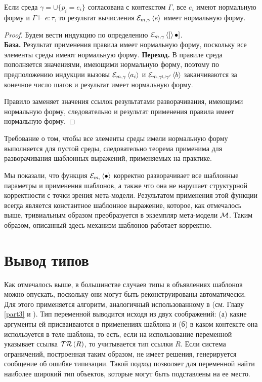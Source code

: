 \begin{Th}[О нормализации]\label{ThNorm}
Если среда $\gamma = \cup \{p_i = e_i\}$ согласована с контекстом $\Gamma$, все $e_i$ имеют нормальную форму и $\Gamma \vdash e : \tau$, то результат вычисления $\mathcal{E}_{m, \gamma} \left\langle e \right\rangle$ имеет нормальную форму.
\end{Th}
\begin{proof} 
Будем вести индукцию по определению $\mathcal{E}_{m, \gamma} \left\langle [ \right\rangle\bullet]$.\\
\textbf{База.} Результат применения правила  имеет нормальную форму, поскольку все элементы среды имеют нормальную форму.
\textbf{Переход.} В правиле  среда пополняется значениями, имеющими нормальную форму, поэтому по предположению индукции вызовы $\mathcal{E}_{m, \gamma} \left\langle a_i \right\rangle$ и $\mathcal{E}_{m, \gamma \cup \gamma'} \left\langle b \right\rangle$ заканчиваются за конечное число шагов и результат имеет нормальную форму.

Правило  заменяет значения ссылок результатами разворачивания, имеющими нормальную форму, следовательно и результат применения правила имеет нормальную форму.
\end{proof}

Требование о том, чтобы все элементы среды имели нормальную форму выполняется для пустой среды, следовательно теорема применима для разворачивания шаблонных выражений, применяемых на практике.

Мы показали, что функция $\mathcal{E}_{m, } \left\langle \bullet \right\rangle$ корректно разворачивает все шаблонные параметры и применения шаблонов, а также что она не нарушает структурной корректности с точки зрения мета-модели. Результатом применения этой функции всегда является константное шаблонное выражение, которое, как отмечалось выше, тривиальным образом преобразуется в экземпляр мета-модели $\mathcal{M}$. Таким образом, описанный здесь механизм шаблонов работает корректно.

\section{Вывод типов}

Как отмечалось выше, в большинстве случаев типы в объявлениях шаблонов можно опускать, поскольку они могут быть реконструированы автоматически. Для этого применяется алгоритм, аналогичный использованному в \ATF{} (см. Главу \ref{part3} и \cite{Pierce}). Тип переменной выводится исходя из двух соображений: (а) какие аргументы ей присваиваются в применениях шаблона и (б) в каком контексте она используется в теле шаблона, то есть, если на использование переменной указывает ссылка $\mathcal{TR}\left(R\right)$, то учитывается тип ссылки $R$. Если система ограничений, построенная таким образом, не имеет решения, генерируется сообщение об ошибке типизации. Такой подход позволяет для переменной найти наиболее широкий тип объектов, которые могут быть подставлены на ее место.

